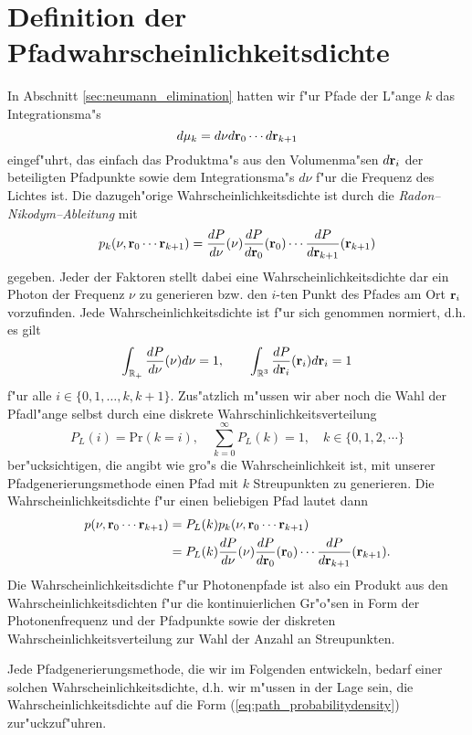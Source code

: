 	\section{Definition der Pfadwahrscheinlichkeitsdichte}
	In Abschnitt \ref{sec:neumann_elimination} hatten wir f"ur Pfade der L"ange $k$ das Integrationsma"s $$d\mu_k=d\nu d\mathbf{r}_0\cdots d\mathbf{r}_{k+1}$$ eingef"uhrt, das einfach das Produktma"s aus den Volumenma"sen $d\mathbf{r}_i$ der beteiligten Pfadpunkte sowie dem Integrationsma"s $d\nu$ f"ur die Frequenz des Lichtes ist. Die dazugeh"orige Wahrscheinlichkeitsdichte ist durch die {\em Radon--Nikodym--Ableitung} mit
	$$p_k(\nu,\mathbf{r}_0\cdots \mathbf{r}_{k+1})=\frac{dP}{d\nu}(\nu)\frac{dP}{d\mathbf{r}_0}(\mathbf{r}_0)\cdots\frac{dP}{d\mathbf{r}_{k+1}}(\mathbf{r}_{k+1})$$
	gegeben. Jeder der Faktoren stellt dabei eine Wahrscheinlichkeitsdichte dar ein Photon der Frequenz $\nu$ zu generieren bzw. den $i$-ten Punkt des Pfades am Ort $\mathbf{r}_i$ vorzufinden. Jede Wahrscheinlichkeitsdichte ist f"ur sich genommen normiert, d.h. es gilt
	$$\int_{\mathbb{R}_+} \frac{dP}{d\nu}(\nu) d\nu=1,\qquad \int_{\mathbb{R}^3} \frac{dP}{d\mathbf{r}_i}(\mathbf{r}_i) d\mathbf{r}_i=1$$
	f"ur alle $i\in\{0,1,\dots,k,k+1\}$. Zus"atzlich m"ussen wir aber noch die Wahl der Pfadl"ange selbst durch eine diskrete Wahrschinlichkeitsverteilung
	$$P_L(i)=\text{Pr}(k=i),\quad\sum_{k=0}^\infty P_L(k)=1,\quad k\in\{0,1,2,\cdots\}$$ ber"ucksichtigen, die angibt wie gro"s die Wahrscheinlichkeit ist, mit unserer Pfadgenerierungsmethode einen Pfad mit $k$ Streupunkten zu generieren. Die Wahrscheinlichkeitsdichte f"ur einen beliebigen Pfad lautet dann
	\begin{align}
		p(\nu,\mathbf{r}_0\cdots \mathbf{r}_{k+1})&=P_L(k)p_k(\nu,\mathbf{r}_0\cdots \mathbf{r}_{k+1}) \nonumber\\
		&=P_L(k)\frac{dP}{d\nu}(\nu)\frac{dP}{d\mathbf{r}_0}(\mathbf{r}_0)\cdots\frac{dP}{d\mathbf{r}_{k+1}}(\mathbf{r}_{k+1}).
		\label{eq:path_probabilitydensity}
	\end{align}
	Die Wahrscheinlichkeitsdichte f"ur Photonenpfade ist also ein Produkt aus den Wahrscheinlichkeitsdichten f"ur die kontinuierlichen Gr"o"sen in Form der Photonenfrequenz und der Pfadpunkte sowie der diskreten Wahrscheinlichkeitsverteilung zur Wahl der Anzahl an Streupunkten.
	
	Jede Pfadgenerierungsmethode, die wir im Folgenden entwickeln, bedarf einer solchen Wahrscheinlichkeitsdichte, d.h. wir m"ussen in der Lage sein, die Wahrscheinlichkeitsdichte auf die Form (\ref{eq:path_probabilitydensity}) zur"uckzuf"uhren.
	
